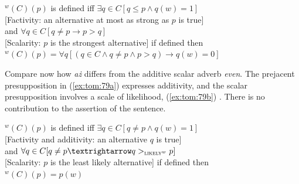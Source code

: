 \documentclass[output=paper,colorlinks,citecolor=brown]{langscibook}
\begin{document}

\ea\label{ex:tom:78}
$^w(C)(p)$ is defined iff
\ea $\exists q\in C [q\leq p\wedge q(w) = 1]$\label{ex:tom:78a}\\
{[Factivity: an alternative at most as strong as $p$ is true]}\smallskip\\
and
\ex $\forall q\in C [q\neq p → p > q]$\label{ex:tom:78b}\\
{[Scalarity: $p$ is the strongest alternative]}\smallskip    
\z
if defined then\\
$^w(C)(p) =\forall q[(q\in C\wedge q\neq p\wedge p > q ) → q (w) = 0]$ 
\z 

\noindent Compare now how \textit{aż} differs from the additive scalar adverb \textit{even}. The prejacent presupposition in (\ref{ex:tom:79a}) expresses additivity, and the scalar presupposition involves a scale of likelihood, (\ref{ex:tom:79b}) \citep{guerzoni03}. There is no contribution to the assertion of the sentence.


\ea\label{ex:tom:79}
$^w(C)(p)$ is defined iff 
\ea $\exists q\in C [q\neq p\wedge q(w)=1]$\label{ex:tom:79a}\\
{[Factivity and additivity:  an alternative $q$ is true]}\smallskip\\
and
\ex $\forall q\in C [q\neq p → q >_{\textsc{likely}^w} p]$\label{ex:tom:79b}\\
{[Scalarity: $p$ is the least likely alternative]}\smallskip
\z
if defined then\\
$^w(C)(p) = p(w)$
\z 
\end{document}
